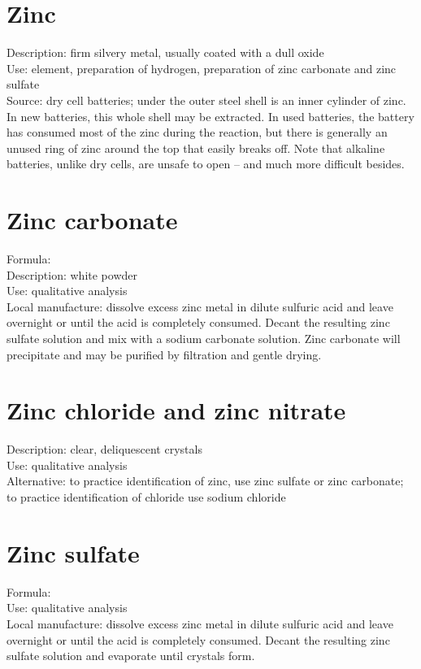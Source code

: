 \section{Zinc}
\label{sec:zinc}
Description: firm silvery metal, 
usually coated with a dull oxide\\
Use: element, 
preparation of hydrogen, 
preparation of zinc carbonate and zinc sulfate\\
Source: dry cell batteries; 
under the outer steel shell is an inner cylinder of zinc. 
In new batteries, 
this whole shell may be extracted. 
In used batteries, 
the battery has consumed most of the zinc during the reaction, 
but there is generally an unused ring of zinc around the top 
that easily breaks off. 
Note that alkaline batteries, 
unlike dry cells, 
are unsafe to open -- and much more difficult besides.

\section{Zinc carbonate}
Formula: \\
Description: white powder\\
Use: qualitative analysis\\
Local manufacture: dissolve excess zinc metal 
in dilute sulfuric acid and leave overnight 
or until the acid is completely consumed. 
Decant the resulting zinc sulfate solution and 
mix with a sodium carbonate solution. 
Zinc carbonate will precipitate 
and may be purified by filtration and gentle drying.

\section{Zinc chloride and zinc nitrate}
Description: clear, 
deliquescent crystals\\
Use: qualitative analysis\\
Alternative: to practice identification of zinc, 
use zinc sulfate or zinc carbonate; 
to practice identification of chloride use sodium chloride

\section{Zinc sulfate}
Formula: \\
Use: qualitative analysis\\
Local manufacture: dissolve excess zinc metal in dilute sulfuric acid 
and leave overnight or until the acid is completely consumed. 
Decant the resulting zinc sulfate solution and evaporate until crystals form.
